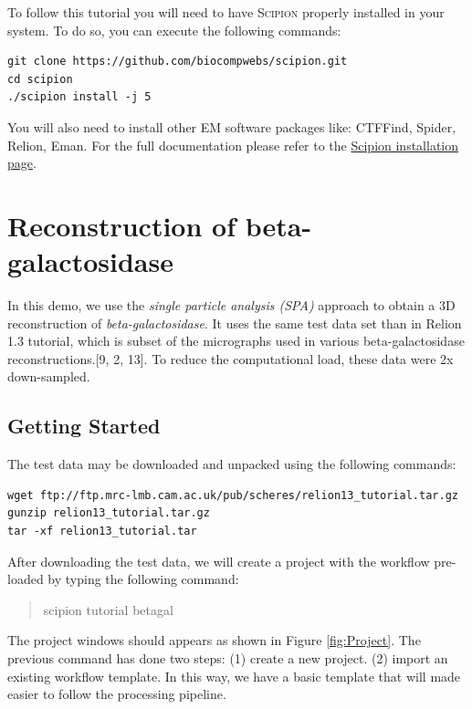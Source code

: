 \documentclass[12pt]{article} %
\newcommand{\scipion}{\textsc{Scipion} }
\newenvironment{command}{\tt\begin{quote}}{\end{quote}}
\begin{document}
To follow this tutorial you will need to have \scipion properly installed
in your system. To do so, you can execute the following commands:

\begin{verbatim} 
git clone https://github.com/biocompwebs/scipion.git
cd scipion
./scipion install -j 5
\end{verbatim}

You will also need to install other EM software packages like: 
CTFFind, Spider, Relion, Eman. For the full documentation please refer to the
\href{http://scipion.cnb.csic.es/docs/bin/view/TWiki/NewInstallation}{Scipion installation page}.


\section{Reconstruction of beta-galactosidase}

In this demo, we use the \emph{single particle analysis (SPA)}  approach to obtain
a 3D reconstruction of \emph{beta-galactosidase}. It uses the same test data set than
in Relion 1.3 tutorial, which is subset of the micrographs used in various beta-galactosidase reconstructions.[9, 2, 13].
To reduce
the computational load, these data were 2x down-sampled.


\subsection{Getting Started}

The test data may be downloaded and unpacked using the following commands:

\begin{verbatim}
wget ftp://ftp.mrc-lmb.cam.ac.uk/pub/scheres/relion13_tutorial.tar.gz
gunzip relion13_tutorial.tar.gz
tar -xf relion13_tutorial.tar
\end{verbatim}

After downloading the test data, we will create a project with the workflow pre-loaded
by typing the following command:

\begin{command}
 scipion tutorial betagal
\end{command}

The project windows should appears as shown in Figure \ref{fig:Project}. The previous command has done two 
steps: (1) create a new project. (2) import an existing workflow template. In this way, 
we have a basic template that will made easier to follow the processing pipeline. 
\end{document}
